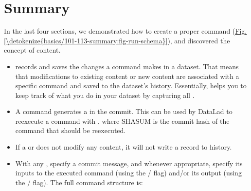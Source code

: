 \section{Summary}
\label{\detokenize{basics/101-113-summary:summary}}\label{\detokenize{basics/101-113-summary:run6}}\label{\detokenize{basics/101-113-summary::doc}}
\sphinxAtStartPar
In the last four sections, we demonstrated how to create a proper 
command (\hyperref[\detokenize{basics/101-113-summary:fig-run-schema}]{Fig.\@ \ref{\detokenize{basics/101-113-summary:fig-run-schema}}}), and discovered the concept of  content.
\begin{itemize}
\item {} 
\sphinxAtStartPar
{} records and saves the changes a command makes in a dataset. That means
that modifications to existing content or new content are associated with a specific command
and saved to the dataset’s history. Essentially,  helps you to keep
track of what you do in your dataset by capturing all {\hyperref[\detokenize{glossary:term-provenance}]{}}.

\item {} 
\sphinxAtStartPar
A  command generates a  in the commit. This {\hyperref[\detokenize{glossary:term-run-record}]{}} can be used
by DataLad to re\sphinxhyphen{}execute a command with , where SHASUM is the
commit hash of the  command that should be re\sphinxhyphen{}executed.

\item {} 
\sphinxAtStartPar
If a  or  does not modify any content, it will not write a
record to history.

\item {} 
\sphinxAtStartPar
With any , specify a commit message, and whenever appropriate, specify its inputs
to the executed command (using the / flag) and/or its output (using the /
 flag). The full command structure is:


\end{itemize}
